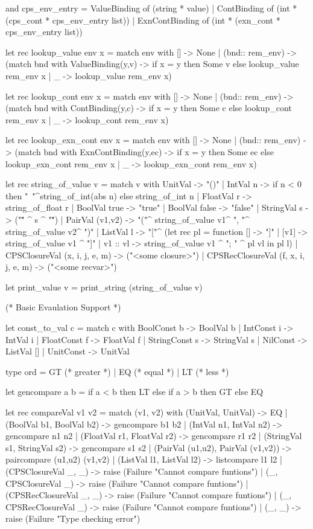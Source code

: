 and cps_env_entry =
     ValueBinding of (string * value)
   | ContBinding of (int * (cps_cont * cps_env_entry list))
   | ExnContBinding of (int * (exn_cont * cps_env_entry list))

let rec lookup_value env x =
   match env with [] -> None
   | (bnd:: rem_env) ->
    (match bnd with ValueBinding(y,v) ->
      if x = y then Some v else lookup_value rem_env x
     | _ -> lookup_value rem_env x)

let rec lookup_cont env x =
   match env with [] -> None
   | (bnd:: rem_env) ->
    (match bnd with ContBinding(y,c) ->
      if x = y then Some c else lookup_cont rem_env x
     | _ -> lookup_cont rem_env x)

let rec lookup_exn_cont env x =
   match env with [] -> None
   | (bnd:: rem_env) ->
    (match bnd with ExnContBinding(y,ec) ->
      if x = y then Some ec else lookup_exn_cont rem_env x
     | _ -> lookup_exn_cont rem_env x)

let rec string_of_value v =
   match v with
    UnitVal           -> "()"
  | IntVal n          -> if n < 0 then "~"^string_of_int(abs n) else string_of_int n 
  | FloatVal r        -> string_of_float r
  | BoolVal true      -> "true"
  | BoolVal false     -> "false"
  | StringVal s       ->  ("\"" ^ s ^ "\"")
  | PairVal (v1,v2)   -> "("^
                         string_of_value v1^  ", "^
                         string_of_value v2^
                          ")"
  | ListVal l         -> "["^
                         (let rec pl = function
                              []     -> "]"
                              | [v1] -> string_of_value v1 ^ "]"
                              | v1 :: vl -> string_of_value v1 ^ "; " ^ pl vl
                              in pl l)
  | CPSClosureVal (x, i, j, e, m) ->  ("<some closure>")
  | CPSRecClosureVal (f, x, i, j, e, m)  ->  ("<some recvar>")

let print_value v = print_string (string_of_value v)


(* Basic Evaulation Support *)

let const_to_val c = 
  match c with
    BoolConst b   -> BoolVal b
  | IntConst i    -> IntVal i
  | FloatConst f  -> FloatVal f
  | StringConst s -> StringVal s
  | NilConst      -> ListVal []
  | UnitConst     -> UnitVal

type ord = GT (* greater *) | EQ (* equal *) | LT (* less *)

let gencompare a b =
  if a < b then LT
  else if a > b then GT
  else EQ

let rec compareVal v1 v2 =
   match (v1, v2) with
    (UnitVal, UnitVal) -> EQ
  | (BoolVal b1, BoolVal b2) -> gencompare b1 b2
  | (IntVal n1, IntVal n2) -> gencompare n1 n2
  | (FloatVal r1, FloatVal r2) -> gencompare r1 r2
  | (StringVal s1, StringVal s2) -> gencompare s1 s2
  | (PairVal (u1,u2), PairVal (v1,v2)) -> paircompare (u1,u2) (v1,v2)
  | (ListVal l1, ListVal l2) -> listcompare l1 l2
  | (CPSClosureVal _, _) -> raise (Failure "Cannot compare funtions")
  | (_, CPSClosureVal _) -> raise (Failure "Cannot compare funtions")
  | (CPSRecClosureVal _, _) -> raise (Failure "Cannot compare funtions")
  | (_, CPSRecClosureVal _) -> raise (Failure "Cannot compare funtions")
  | (_, _) -> raise (Failure "Type checking error")

